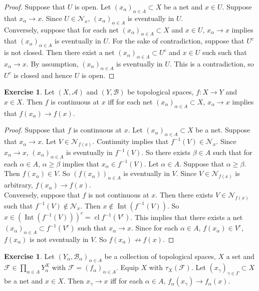 \documentclass[12pt]{amsart}
\theoremstyle{definition}
\newtheorem{ex}[definition]{Exercise}
\newcommand{\al}{\alpha}
\newcommand{\gam}{\gamma}
\newcommand{\Gam}{\Gamma}
\newcommand{\be}{\beta}
\newcommand{\MA}{\mathcal{A}}
\newcommand{\MB}{\mathcal{B}}
\newcommand{\MF}{\mathcal{F}}
\newcommand{\MN}{\mathcal{N}}
\DeclareMathOperator{\cl}{cl}
\DeclareMathOperator{\Int}{Int}
\DeclareMathOperator*{\0}{\mbf{0}}
\DeclareMathOperator*{\1}{\mbf{1}}
\newcommand{\lex}[1]{\label{ex:#1}}
\begin{document}
	\begin{proof}
		Suppose that $U$ is open. Let $(x_{\al})_{\al \in A} \subset X$ be a net and $x \in U$. Suppose that $x_{\al} \rightarrow x$. Since $U \in \MN_x$, $(x_{\al})_{\al \in A}$ is eventually in $U$. \\
		Conversely, suppose that for each net $(x_{\al})_{\al \in A} \subset X$ and $x \in U$, $x_{\al} \rightarrow x$ implies that $(x_{\al})_{\al \in A} $ is eventually in $U$. For the sake of contradiction, suppose that $U^c$ is not closed. Then there exist a net $(x_{\al})_{\al \in A} \subset U^c$ and $x \in U$ such such that $x_{\al} \rightarrow x$. By assumption, $(x_{\al})_{\al \in A}$ is eventually in $U$. This is a contradiction, so $U^c$ is closed and hence $U$ is open. 
	\end{proof}
	
	\begin{ex} \lex{33010}
	Let $(X,\MA)$ and $(Y,\MB)$ be topological spaces, $f:X \rightarrow Y$ and $x \in X$. Then $f$ is continuous at $x$ iff for each net $(x_{\al})_{\al \in A} \subset X$, $x_{\al} \rightarrow x$ implies that $f(x_{\al}) \rightarrow f(x)$. 
	\end{ex}
	
	\begin{proof}
	Suppose that $f$ is continuous at $x$. Let $(x_{\al})_{\al \in A} \subset X$ be a net. Suppose that $x_{\al} \rightarrow x$. Let $V \in \MN_{f(x)}$. Continuity implies that $f^{-1}(V) \in \MN_{x}$. Since  $x_{\al} \rightarrow x$, $(x_{\al})_{\al \in A}$ is eventually in $f^{-1}(V)$. So there exists $\be \in A$ such that for each $\al \in A$, $\al \geq \be$ implies that $x_{\al} \in f^{-1}(V)$. Let $\al \in A$. Suppose that $\al \geq \be$. Then $f(x_{\al}) \in V$. So $(f(x_{\al}))_{\al \in A}$ is eventually in $V$. Since $V \in \MN_{f(x)}$ is arbitrary, $f(x_{\al}) \rightarrow f(x)$.\\
	Conversely, suppose that $f$ is not continuous at $x$. Then there exists $V \in \MN_{f(x)}$ such that $f^{-1}(V) \not \in \MN_x$. Then $x \not \in \Int (f^{-1}(V))$. So $x \in (\Int (f^{-1}(V)))^c = \cl f^{-1}(V^c)$. This implies that there exists a net $(x_{\al})_{\al \in A} \subset f^{-1}(V^c)$ such that $x_{\al} \rightarrow x$. Since for each $\al \in A$, $f(x_{\al}) \in V^c$, $f(x_{\al})$ is not eventually in $V$. So $f(x_{\al}) \not \rightarrow f(x)$. 
\end{proof}		
	
	\begin{ex} \lex{33011}
	Let $(Y_{\al}, \MB_{\al})_{\al \in A}$ be a collection of topological spaces, $X$ a set and $\MF \in \prod \limits_{\al \in A}Y_{\al}^X$ with $\MF = (f_{\al})_{\al \in A}$. Equip $X$ with $\tau_X(\MF)$. Let $(x_{\gam})_{\gam \in \Gam} \subset X$ be a net and $x \in X$. Then $x_{\gam} \rightarrow x$ iff for each $\al \in A$, $f_{\al}(x_{\gam}) \rightarrow f_{\al}(x)$.  
	\end{ex}
	
\end{document}
